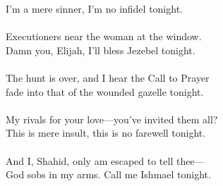 \begin{Parallel}{0.48\textwidth}{0.48\textwidth}
{I’m a mere sinner, I’m no infidel tonight.\\
\-\ \\Executioners near the woman at the window.\\
Damn you, Elijah, I’ll bless Jezebel tonight.\\
\-\ \\The hunt is over, and I hear the Call to Prayer\\
fade into that of the wounded gazelle tonight.\\
\-\ \\My rivals for your love—you’ve invited them all?\\
This is mere insult, this is no farewell tonight.\\
\-\ \\And I, Shahid, only am escaped to tell thee—\\
God sobs in my arms. Call me Ishmael tonight.}
\ParallelPar
\end{Parallel}